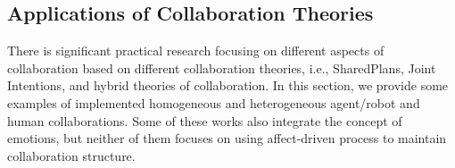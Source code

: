 \documentclass[12pt]{report}
\begin{document}

\subsection{Applications of Collaboration Theories}
\label{sec:applicaiton}

There is significant practical research focusing on different aspects of
collaboration based on different collaboration theories, i.e., SharedPlans,
Joint Intentions, and hybrid theories of collaboration. In this section, we
provide some examples of implemented homogeneous and heterogeneous agent/robot
and human collaborations. {\color{red}Some of these works also integrate the
concept of emotions, but neither of them focuses on using affect-driven
process to maintain collaboration structure.}
\end{document}
